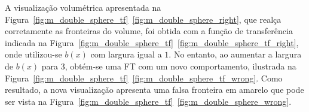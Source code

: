 	A visualização volumétrica apresentada na Figura~\ref{fig:m_double_sphere_tf}~\ref{fig:m_double_sphere_right}, que realça corretamente as fronteiras do volume, foi obtida com a função de transferência indicada na Figura~\ref{fig:m_double_sphere_tf}~\ref{fig:m_double_sphere_tf_right}, onde utilizou-se $ b(x) $ com largura igual a $ 1 $. No entanto, ao aumentar a largura de $ b(x) $ para $ 3 $, obtém-se uma FT com um novo comportamento, ilustrada na Figura~\ref{fig:m_double_sphere_tf}~\ref{fig:m_double_sphere_tf_wrong}. Como resultado, a nova visualização apresenta uma falsa fronteira em amarelo que pode ser vista na Figura~\ref{fig:m_double_sphere_tf}~\ref{fig:m_double_sphere_wrong}.

\begin{figure}[h]
	\centering
\end{figure}
